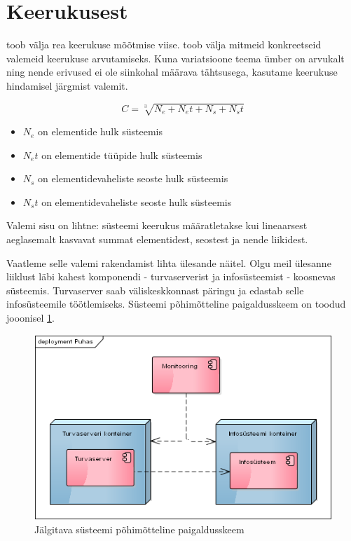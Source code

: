 \documentclass{tufte-book}
\begin{document}
\section{Keerukusest}
\label{sec:complexity}
\cite{mitchell2009complexity} toob välja rea keerukuse mõõtmise viise. \citeauthor{crawley2015systems}\cite{crawley2015systems} toob välja mitmeid konkreetseid valemeid keerukuse arvutamiseks. Kuna variatsioone teema ümber on arvukalt ning nende erivused ei ole siinkohal määrava tähtsusega, kasutame keerukuse hindamisel järgmist valemit. 

\begin{equation}
	C = \sqrt[3]{N_e + N_et + N_s + N_st}
	\label{eq:complexity}
\end{equation}

\begin{itemize}
	\item $N_e$ on elementide hulk süsteemis
	\item $N_et$ on elementide tüüpide hulk süsteemis
	\item $N_s$ on elementidevaheliste seoste hulk süsteemis
	\item $N_st$ on elementidevaheliste seoste hulk süsteemis
\end{itemize}

Valemi sisu on lihtne: süsteemi keerukus määratletakse kui lineaarsest aeglasemalt kasvavat summat elementidest, seostest ja nende liikidest. 

Vaatleme selle valemi rakendamist lihta ülesande näitel. Olgu meil ülesanne liiklust läbi kahest komponendi - turvaserverist ja infosüsteemist - koosnevas süsteemis. Turvaserver saab väliskeskkonnast päringu ja edastab selle infosüsteemile töötlemiseks. Süsteemi põhimõtteline paigaldusskeem on toodud jooonisel \ref{fig:complexity:pure}.

\begin{figure}[htp]
	\begin{center}
		\includegraphics[width=.6\textwidth]{puhas.png}
		\caption{Jälgitava süsteemi põhimõtteline paigaldusskeem}
		\label{fig:complexity:pure}
	\end{center}
\end{figure}
\end{document}
